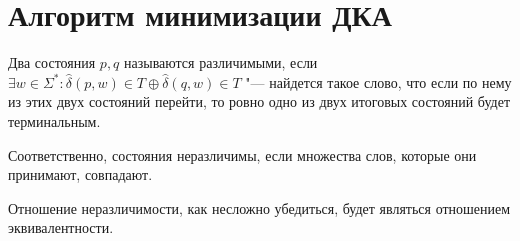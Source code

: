 \section{Алгоритм минимизации ДКА}
\begin{Def}
Два состояния $p, q$ называются различимыми, если $\exists w \in \Sigma^*: \hat \delta(p,  w) \in T \oplus \hat \delta(q, w) \in T$ "---
найдется такое слово, что если по нему из этих двух состояний перейти, то ровно одно из двух итоговых состояний будет терминальным.

Соответственно, состояния неразличимы, если множества слов, которые они принимают, совпадают.
\end{Def}
\begin{Rem}
Отношение неразличимости, как несложно убедиться, будет являться отношением эквивалентности.
\end{Rem}

